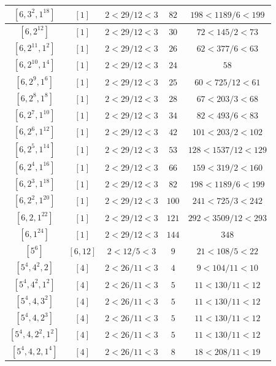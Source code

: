 \documentclass{article}%
\begin{document}
\begin{center}
\begin{longtable}{||c|c|c|c|c||}
$[6, 3^{2}, 1^{18}]$ & $[1]$ & $2 < 29/12 < 3$ & $82$ & $198 < 1189/6 < 199$ \\ \hline 
$[6, 2^{12}]$ & $[1]$ & $2 < 29/12 < 3$ & $30$ & $72 < 145/2 < 73$ \\ \hline 
$[6, 2^{11}, 1^{2}]$ & $[1]$ & $2 < 29/12 < 3$ & $26$ & $62 < 377/6 < 63$ \\ \hline 
$[6, 2^{10}, 1^{4}]$ & $[1]$ & $2 < 29/12 < 3$ & $24$ & $58$ \\ \hline 
$[6, 2^{9}, 1^{6}]$ & $[1]$ & $2 < 29/12 < 3$ & $25$ & $60 < 725/12 < 61$ \\ \hline 
$[6, 2^{8}, 1^{8}]$ & $[1]$ & $2 < 29/12 < 3$ & $28$ & $67 < 203/3 < 68$ \\ \hline 
$[6, 2^{7}, 1^{10}]$ & $[1]$ & $2 < 29/12 < 3$ & $34$ & $82 < 493/6 < 83$ \\ \hline 
$[6, 2^{6}, 1^{12}]$ & $[1]$ & $2 < 29/12 < 3$ & $42$ & $101 < 203/2 < 102$ \\ \hline 
$[6, 2^{5}, 1^{14}]$ & $[1]$ & $2 < 29/12 < 3$ & $53$ & $128 < 1537/12 < 129$ \\ \hline 
$[6, 2^{4}, 1^{16}]$ & $[1]$ & $2 < 29/12 < 3$ & $66$ & $159 < 319/2 < 160$ \\ \hline 
$[6, 2^{3}, 1^{18}]$ & $[1]$ & $2 < 29/12 < 3$ & $82$ & $198 < 1189/6 < 199$ \\ \hline 
$[6, 2^{2}, 1^{20}]$ & $[1]$ & $2 < 29/12 < 3$ & $100$ & $241 < 725/3 < 242$ \\ \hline 
$[6, 2, 1^{22}]$ & $[1]$ & $2 < 29/12 < 3$ & $121$ & $292 < 3509/12 < 293$ \\ \hline 
$[6, 1^{24}]$ & $[1]$ & $2 < 29/12 < 3$ & $144$ & $348$ \\ \hline 
$[5^{6}]$ & $[6, 12]$ & $2 < 12/5 < 3$ & $9$ & $21 < 108/5 < 22$ \\ \hline 
$[5^{4}, 4^{2}, 2]$ & $[4]$ & $2 < 26/11 < 3$ & $4$ & $9 < 104/11 < 10$ \\ \hline 
$[5^{4}, 4^{2}, 1^{2}]$ & $[4]$ & $2 < 26/11 < 3$ & $5$ & $11 < 130/11 < 12$ \\ \hline 
$[5^{4}, 4, 3^{2}]$ & $[4]$ & $2 < 26/11 < 3$ & $5$ & $11 < 130/11 < 12$ \\ \hline 
$[5^{4}, 4, 2^{3}]$ & $[4]$ & $2 < 26/11 < 3$ & $5$ & $11 < 130/11 < 12$ \\ \hline 
$[5^{4}, 4, 2^{2}, 1^{2}]$ & $[4]$ & $2 < 26/11 < 3$ & $5$ & $11 < 130/11 < 12$ \\ \hline 
$[5^{4}, 4, 2, 1^{4}]$ & $[4]$ & $2 < 26/11 < 3$ & $8$ & $18 < 208/11 < 19$ \\ \hline 

\end{longtable}
\end{center}
\end{document}
